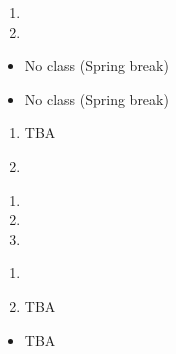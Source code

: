 \documentclass{article}
\begin{document}
\dia{}\NC{} 
\dia{}
\begin{enumerate}
\item {}
\item {}
\end{enumerate}


\week{}
\dia{}
\begin{itemize}
\item No class (Spring break)
\end{itemize}

\dia{}
\begin{itemize}
\item No class (Spring break)
\end{itemize}



\dia{}
\begin{enumerate}
\item TBA %
\item {}
\end{enumerate}

\dia{}
\begin{enumerate}
\item {}
\item {}
\item {}
\end{enumerate}

\week{}

\dia{} 
\begin{enumerate}
\item {}
\item TBA
\end{enumerate}

\dia{}
\begin{itemize}
\item[ ] TBA
\end{itemize}

\week{}
\end{document}
